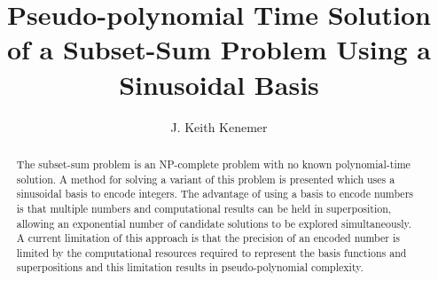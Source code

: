 \documentclass[reqno]{amsart}
\theoremstyle{definition}
\theoremstyle{remark}
\begin{document}

\title{Pseudo-polynomial Time Solution of a Subset-Sum Problem Using a Sinusoidal Basis  }

\author{J. Keith Kenemer}






\begin{abstract}
The subset-sum problem is an NP-complete problem with no known polynomial-time solution. A method for solving a variant of
this problem is presented which uses a sinusoidal basis to encode integers. The advantage of using a basis to encode numbers is that 
multiple numbers and computational results can be held in superposition, allowing an exponential number of candidate solutions to
be explored simultaneously. A current limitation of this approach is that the precision of an encoded number is limited by the 
computational resources required to represent the basis functions and superpositions and this limitation results in pseudo-polynomial 
complexity.    
\end{abstract}


 \maketitle
\end{document}
